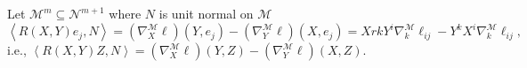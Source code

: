 \begin{remark}
	Let \(\mathcal{M} ^m \subseteq \mathcal{N} ^{m+1}\) where \(N\) is unit normal on \(\mathcal{M} \)
	\[
		\left\langle R(X, Y) e_j , N \right\rangle = (\nabla _X ^{\mathcal{M} } \ell ) (Y, e_j) - (\nabla _Y ^{\mathcal{M} } \ell )(X, e_j)
		= Xrk Y^i \nabla _k^{\mathcal{M} } \ell _{ij} - Y^k X^i \nabla _k^{\mathcal{M} } \ell _{ij},
	\]
	i.e., \(\left\langle R(X, Y) Z, N \right\rangle = (\nabla _X^{\mathcal{M} } \ell )(Y, Z) - (\nabla _Y^{\mathcal{M} } \ell )(X, Z)\).
\end{remark}
